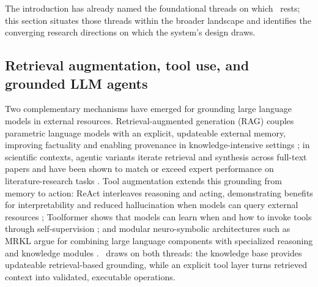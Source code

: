 The introduction has already named the foundational threads on which \cmapagent\ rests; this section situates those threads within the broader landscape and identifies the converging research directions on which the system's design draws.

\subsection{Retrieval augmentation, tool use, and grounded LLM agents}
Two complementary mechanisms have emerged for grounding large language models in external resources.
Retrieval-augmented generation (RAG) couples parametric language models with an explicit, updateable external memory, improving factuality and enabling provenance in knowledge-intensive settings \citep{Lewis2020RAG}; in scientific contexts, agentic variants iterate retrieval and synthesis across full-text papers and have been shown to match or exceed expert performance on literature-research tasks \citep{Lala2023PaperQA,Skarlinski2024PaperQA2}.
Tool augmentation extends this grounding from memory to action: ReAct interleaves reasoning and acting, demonstrating benefits for interpretability and reduced hallucination when models can query external resources \citep{Yao2022ReAct}; Toolformer shows that models can learn when and how to invoke tools through self-supervision \citep{Schick2023Toolformer}; and modular neuro-symbolic architectures such as MRKL argue for combining large language components with specialized reasoning and knowledge modules \citep{Karpas2022MRKL}.
\cmapagent\ draws on both threads: the knowledge base provides updateable retrieval-based grounding, while an explicit tool layer turns retrieved context into validated, executable operations.

